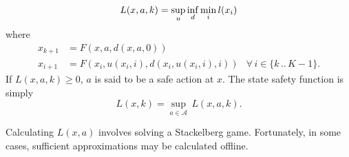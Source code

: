 \documentclass{article}
\newcommand{\aspace}{\ensuremath{\mathcal{A}} }
\begin{document}
\begin{equation}
    L(x, a, k) = \underset{u}{\sup}\,\underset{d}{\inf}\,\underset{i}{\min}\,l(x_i) \\
\end{equation}
where
\begin{equation*}
    \begin{aligned}
        x_{k+1} &= F(x, a, d(x, a, 0)) \\
        x_{i+1} &= F(x_i, u(x_i, i), d(x_i, u(x_i, i), i)) & \forall\, i \in \{k\,..\,K-1\} \text{.}
    \end{aligned}
\end{equation*}
If $L(x, a, k) \geq 0$, $a$ is said to be a safe action at $x$. The state safety function is simply
\begin{equation}
    L(x, k) = \underset{a\in\aspace}{\sup}\,L(x,a,k) \text{.}
\end{equation}

Calculating $L(x,a)$ involves solving a Stackelberg game. Fortunately, in some cases, sufficient approximations may be calculated offline.

% 
% 


\end{document}
